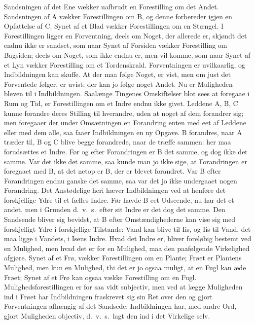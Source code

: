 \documentclass[12pt]{book}
\newcommand{\apage}[1]{\marginnote{\footnotesize\textit{[#1]}}}
\begin{document}
Sandsningen af det Ene vækker uafbrudt en Forestilling om det Andet.
Sandsningen af A vækker Forestillingen om B, og denne forbereder igjen en
Opfattelse af C. Synet af et Blad vækker Forestillingen om en Stængel. I
Forestillingen ligger en Forventning, deels om Noget, der allerede er,
skjøndt det endnu ikke er sandset, som naar Synet af Forsiden vækker
Forestilling om Bagsiden; deels om Noget, som ikke endnu er, men vil
komme, som naar Synet af et Lyn vækker Forestilling om et Tordenskrald.
Forventningen er uvilkaarlig, og Indbildningen kan skuffe. At der maa
følge Noget, er vist, men om just det Forventede følger, er uvist; der kan
jo følge noget Andet. Nu er Muligheden bleven til i Indbildningen.
Saalænge Tingenes Omskiftelser blot sees at foregaae i Rum og Tid, er
Forestillingen om et Indre endnu ikke givet. Leddene A, B, C kunne
forandre deres Stilling til hverandre, uden at noget af dem forandrer sig;
men foregaaer der under Omsætningen en Forandring enten med eet af Leddene
eller med dem alle, saa faaer Indbildningen en ny Opgave. B forandres,
naar A træder til, B og C blive begge forandrede, naar de træffe sammen:
her maa forudsættes \apage{24} et Indre. Før og efter Forandringen er B det samme, og
dog ikke det samme. Var det ikke det samme, saa kunde man jo ikke sige, at
Forandringen er foregaaet med B, at det netop er B, der er blevet
forandret. Var B efter Forandringen endnu ganske det samme, saa var det jo
ikke undergaaet nogen Forandring. Det Anstødelige heri hæver Indbildningen
ved at henføre det forskjellige Ydre til et fælles Indre. Før havde B eet
Udseende, nu har det et andet, men i Grunden d.\ v.\ s.\ efter sit Indre er
det dog det samme. Den Sandsende bliver sig bevidst, at B efter
Omstændighederne kan vise sig med forskjelligt Ydre i forskjellige
Tilstande: Vand kan blive til Iis, og Iis til Vand, det maa ligge i
Vandets, i Isens Indre. Hvad det Indre er, bliver foreløbig bestemt ved en
Mulighed, men hvad det er for en Mulighed, maa den paafølgende Virkelighed
afgjøre. Synet af et Frø, vækker Forestillingen om en Plante; Frøet er
Plantens Mulighed, men kun en Mulighed, thi det er jo ogsaa muligt, at en
Fugl kan æde Frøet; Synet af et Frø kan ogsaa vække Forestilling om en
Fugl. Mulighedsforestillingen er for saa vidt subjectiv, men ved at lægge
Muligheden ind i Frøet har Indbildningen fraskrevet sig sin Ret over den
og gjort Forventningen afhængig af det Sandsede; Indbildningen har, med
andre Ord, gjort Muligheden objectiv, d.\ v.\ s.\ lagt den ind i det
Virkelige selv.
\end{document}
